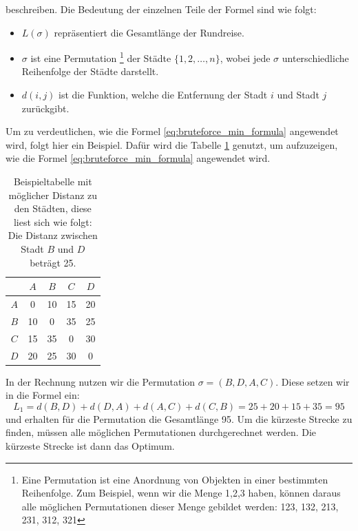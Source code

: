 beschreiben. Die Bedeutung der einzelnen Teile der Formel sind wie folgt:
\begin{itemize}
    \item \( L(\sigma) \) repräsentiert die Gesamtlänge der Rundreise.
    \item \( \sigma \) ist eine Permutation
          \footnote{
              Eine Permutation ist eine Anordnung von Objekten in einer bestimmten Reihenfolge.
              Zum Beispiel, wenn wir die Menge {1,2,3} haben, können daraus alle möglichen 
              Permutationen dieser Menge gebildet werden: 123, 132, 213, 231, 312, 321 
          }
          der Städte \( \{1, 2, \ldots, n\} \),
          wobei jede \( \sigma \) unterschiedliche Reihenfolge der Städte darstellt.
    \item \( d(i, j) \) ist die Funktion, welche die Entfernung der Stadt \( i \) und
          Stadt \( j \) zurückgibt.
\end{itemize}
\begin{beispiel}
    \label{buch:paper:varalg:subsection:bruteforce_calculate}
    Um zu verdeutlichen, wie die Formel \eqref{eq:bruteforce_min_formula}
    angewendet wird, folgt hier ein Beispiel. Dafür wird die Tabelle 
    \ref{tab:example_bruteforce_cities} genutzt, um aufzuzeigen, wie
    die Formel \eqref{eq:bruteforce_min_formula} angewendet wird.
    \begin{table}
        \centering
        \begin{tabular}{|c|c|c|c|c|}
            \hline
                & $A$ & $B$ & $C$ & $D$ \\ \hline
            $A$ & 0   & 10  & 15  & 20  \\ \hline
            $B$ & 10  & 0   & 35  & 25  \\ \hline
            $C$ & 15  & 35  & 0   & 30  \\ \hline
            $D$ & 20  & 25  & 30  & 0   \\ \hline
        \end{tabular}
        \caption{
            Beispieltabelle mit möglicher Distanz zu den Städten, diese liest sich wie folgt:
            Die Distanz zwischen Stadt $B$ und $D$ beträgt 25.
        }
        \label{tab:example_bruteforce_cities}
    \end{table}
    In der Rechnung nutzen wir die Permutation $\sigma = (B, D, A, C)$.
    Diese setzen wir in die Formel ein:
    \begin{equation}
        L_1 = d(B, D) + d(D, A) + d(A, C) + d(C, B)
        =
        25 + 20 + 15 + 35 = 95
        \label{eq:bruteforce_min_formula_example}
    \end{equation}
    und erhalten für die Permutation die Gesamtlänge 95. Um die kürzeste Strecke zu finden,
    müssen alle möglichen Permutationen durchgerechnet werden. Die kürzeste Strecke ist dann
    das Optimum. 
\end{beispiel}
